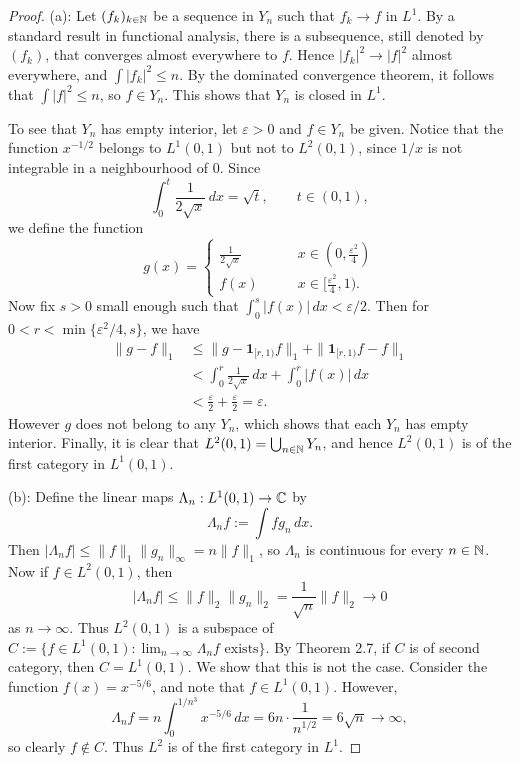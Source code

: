 \begin{proof}
	(a): Let $(f_k)_{k \in \mathbb{N}}$ be a sequence in $Y_n$ such that $f_k \to f$ in $L^1$. By a standard result in functional analysis, there is a subsequence, still denoted by $(f_k)$, that converges almost everywhere to $f$. Hence $|f_k|^2 \to |f|^2$ almost everywhere, and $\int |f_k|^2 \le n$. By the dominated convergence theorem, it follows that $\int |f|^2 \le n$, so $f \in Y_n$. This shows that $Y_n$ is closed in $L^1$.
	
	To see that $Y_n$ has empty interior, let $\varepsilon > 0$ and $f \in Y_n$ be given. Notice that the function $x^{-1/2}$ belongs to $L^1(0,1)$ but not to $L^2(0,1)$, since $1/x$ is not integrable in a neighbourhood of 0. Since
	\begin{equation*}
		\int_0^t \frac{1}{2\sqrt{x}} \,dx = \sqrt{t}, \qquad t \in (0,1),
	\end{equation*}
	we define the function
	\begin{equation*}
		g(x) = \begin{cases}
			\frac{1}{2\sqrt{x}} \qquad &x \in (0, \tfrac{\varepsilon^2}{4}) \\
			f(x) \qquad &x \in [\tfrac{\varepsilon^2}{4}, 1).
		\end{cases}
	\end{equation*}
	Now fix $s > 0$ small enough such that $\int_0^s |f(x)| \,dx < \varepsilon/2$. Then for $0 < r < \min\{\varepsilon^2/4, s\}$, we have
	\begin{align*}
		\|g-f\|_1 &\le \|g - \mathbf{1}_{[r,1)}f\|_1 + \|\mathbf{1}_{[r,1)}f -f\|_1 \\
		&< \int_0^r \frac{1}{2\sqrt{x}} \,dx + \int_0^r |f(x)|\,dx \\
		&< \frac{\varepsilon}{2} + \frac{\varepsilon}{2} = \varepsilon.
	\end{align*}
	However $g$ does not belong to any $Y_n$, which shows that each $Y_n$ has empty interior. Finally, it is clear that $L^2(0,1) = \bigcup_{n\in\mathbb{N}} Y_n$, and hence $L^2(0,1)$ is of the first category in $L^1(0,1)$.
	
	(b): Define the linear maps $\Lambda_n : L^1(0,1) \to \mathbb{C}$ by
	\begin{equation*}
		\Lambda_n f := \int fg_n \,dx.
	\end{equation*}
	Then $|\Lambda_n f| \le \|f\|_1 \|g_n\|_\infty = n\|f\|_1$, so $\Lambda_n$ is continuous for every $n \in \mathbb{N}$. Now if $f \in L^2(0,1)$, then
	\begin{equation*}
		|\Lambda_n f| \le \|f\|_2 \|g_n\|_2 = \frac{1}{\sqrt{n}}\|f\|_2 \longrightarrow 0
	\end{equation*}
	as $n \to \infty$. Thus $L^2(0,1)$ is a subspace of $C := \{ f\in L^1(0,1): \lim_{n\to\infty} \Lambda_n f \text{ exists}\}$. By Theorem 2.7, if $C$ is of second category, then $C=L^1(0,1)$. We show that this is not the case. Consider the function $f(x) = x^{-5/6}$, and note that $f \in L^1(0,1)$. However,
	\begin{equation*}
		\Lambda_n f = n\int_0^{1/n^3} x^{-5/6} \,dx = 6n \cdot \frac{1}{n^{1/2}} = 6\sqrt{n} \longrightarrow \infty,
	\end{equation*}
	so clearly $f \not\in C$. Thus $L^2$ is of the first category in $L^1$.
	

\end{proof}
